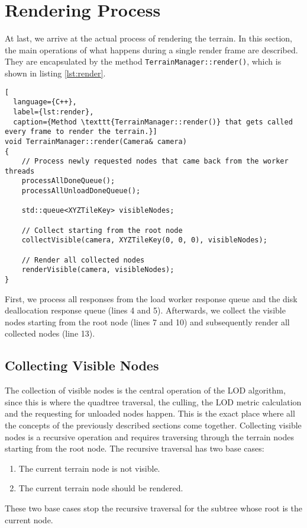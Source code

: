\section{Rendering Process}
At last, we arrive at the actual process of rendering 
the terrain. In this section, 
the main operations of what happens during 
a single render frame are described.
They are encapsulated by the method \texttt{TerrainManager::render()},
which is shown in listing \ref{lst:render}.

\begin{lstlisting}[
  language={C++},
  label={lst:render},
  caption={Method \texttt{TerrainManager::render()} that gets called every frame to render the terrain.}]
void TerrainManager::render(Camera& camera)
{
    // Process newly requested nodes that came back from the worker threads
    processAllDoneQueue();
    processAllUnloadDoneQueue();

    std::queue<XYZTileKey> visibleNodes;

    // Collect starting from the root node
    collectVisible(camera, XYZTileKey(0, 0, 0), visibleNodes);

    // Render all collected nodes
    renderVisible(camera, visibleNodes);
}
\end{lstlisting}

First, we process all responses from the load worker response queue 
and the disk deallocation response queue (lines 4 and 5).
Afterwards, we collect the visible nodes starting from the root node (lines 7 and 10)
and subsequently render all collected nodes (line 13).

\subsection{Collecting Visible Nodes}
The collection of visible nodes is the central operation of 
the LOD algorithm, since this is where 
the quadtree traversal, the culling, the LOD metric calculation and the requesting for unloaded nodes 
happen. This is the exact place where all the concepts of the 
previously described sections come together. 
Collecting visible nodes is a recursive operation and
requires traversing through 
the terrain nodes starting from the root node.
The recursive traversal has two base cases:
\begin{enumerate}
  \item The current terrain node is not visible.
  \item The current terrain node should be rendered.
\end{enumerate}
These two base cases stop the recursive traversal for 
the subtree whose root is the current node.

